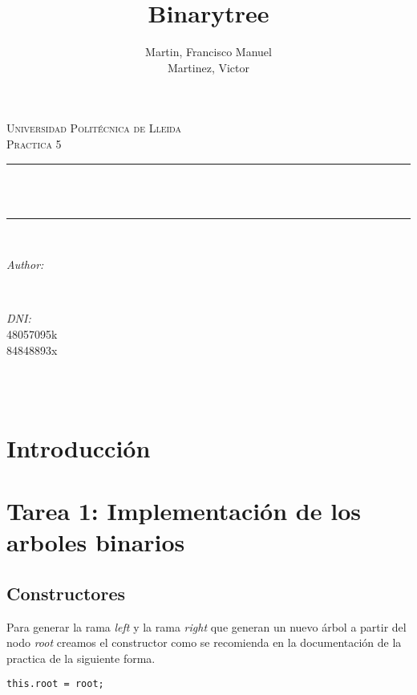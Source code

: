 \documentclass{article}
\title{Binarytree}
\author{Martin, Francisco Manuel \\
        Martinez, Victor
}
\makeatletter
\let\thetitle\@title
\let\theauthor\@author
\let\thedate\@date
\makeatother
\begin{document}
    \begin{titlepage}
	\centering
    \vspace*{0.5 cm}

    \textsc{\LARGE Universidad Politécnica de Lleida}\\[2.0 cm]	%
	\textsc{\large Practica 5}\\[0.5 cm]				%
	\rule{\linewidth}{0.2 mm} \\[0.4 cm]
	{ \huge \bfseries \thetitle}\\
	\rule{\linewidth}{0.2 mm} \\[1.5 cm]

	\begin{minipage}{0.4\textwidth}
		\begin{flushleft} \large
			\emph{Author:}\\
			\theauthor
			\end{flushleft}
			\end{minipage}~
			\begin{minipage}{0.4\textwidth}
			\begin{flushright} \large
			\emph{DNI:} \\
			48057095k \\
			84848893x%
		\end{flushright}
	\end{minipage}\\[2 cm]

	{\large \thedate}\\[2 cm]

	\vfill

\end{titlepage}
\tableofcontents
\pagebreak
\section{Introducción}
\section{Tarea 1: Implementación de los arboles binarios}
    \subsection{Constructores}
    Para generar la rama \textit{left} y la rama \textit{right} que
    generan un nuevo árbol a partir del nodo \textit{root} creamos el
    constructor como se recomienda en la documentación de la practica de la
    siguiente forma.
\begin{lstlisting}[lenguage = Java]
this.root = root;
\end{lstlisting}
\end{document}
